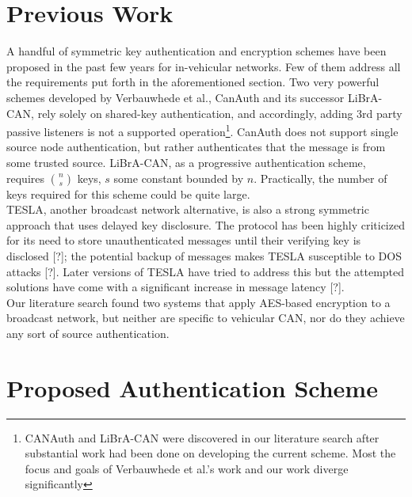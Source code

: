 \documentclass{article}
\begin{document}
\section{Previous Work}
A handful of symmetric key authentication and encryption schemes have been proposed in the past few years for in-vehicular networks. Few of them address all the requirements put forth in the aforementioned section. Two very powerful schemes developed by Verbauwhede et al., CanAuth and its successor LiBrA-CAN, rely solely on shared-key authentication, and accordingly, adding 3rd party passive listeners is not a supported operation\footnote{CANAuth and LiBrA-CAN were discovered in our literature search after substantial work had been done on developing the current scheme. Most the focus and goals of Verbauwhede et al.'s work and our work diverge significantly}. CanAuth does not support single source node authentication, but rather authenticates that the message is from some trusted source. LiBrA-CAN, as a progressive authentication scheme, requires $ n \choose s$ keys, $s$ some constant bounded by $n$. Practically, the number of keys required for this scheme could be quite large.\\

TESLA, another broadcast network alternative, is also a strong symmetric approach that uses delayed key disclosure. The protocol has been highly criticized for its need to store unauthenticated messages until their verifying key is disclosed [?]; the potential backup of messages makes TESLA susceptible to DOS attacks [?]. Later versions of TESLA have tried to address this but the attempted solutions have come with a significant increase in message latency [?].\\

Our literature search found two systems that apply AES-based encryption to a broadcast network, but neither are specific to vehicular CAN, nor do they achieve any sort of source authentication.

\section{Proposed Authentication Scheme}
\end{document}
